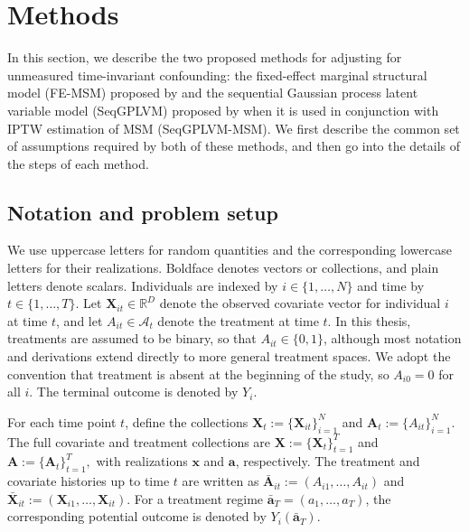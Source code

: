 \chapter{Methods}
\label{chap:method}
In this section, we describe the two proposed methods 
for adjusting for unmeasured time-invariant confounding: the fixed-effect marginal 
structural model (FE-MSM) proposed by 
and the sequential Gaussian process latent variable model (SeqGPLVM) 
proposed by  when it is used 
in conjunction with IPTW estimation of MSM (SeqGPLVM-MSM). We first describe the common set of
assumptions required by both of these methods, and then go 
into the details of the steps of each method.

\section{Notation and problem setup}
\label{sec:notation}

We use uppercase letters for random quantities and the corresponding lowercase
letters for their realizations. Boldface denotes vectors or collections, and plain
letters denote scalars. Individuals are indexed by \(i \in \{1,\dots,N\}\) and time
by \(t \in \{1,\dots,T\}\). Let \(\mathbf{X}_{it} \in \mathbb{R}^D\) denote the observed covariate vector for
individual \(i\) at time \(t\), and let \(A_{it} \in \mathcal{A}_t\) denote the
treatment at time \(t\). In this thesis, treatments are assumed to be binary, so
that \(A_{it} \in \{0,1\}\), although most notation and derivations extend directly
to more general treatment spaces. We adopt the convention that treatment is absent at the
beginning of the study, so \(A_{i0}=0\) for all \(i\). The terminal outcome is denoted by \(Y_i\). 

For each time point \(t\), define the collections
$
\mathbf{X}_t := \{\mathbf{X}_{it}\}_{i=1}^N
$ and
$
\mathbf{A}_t := \{A_{it}\}_{i=1}^N.
$
The full covariate and treatment collections are
$
\mathbf{X} := \{\mathbf{X}_t\}_{t=1}^T 
$ and 
$
\mathbf{A} := \{\mathbf{A}_t\}_{t=1}^T,
$
with realizations \(\mathbf{x}\) and \(\mathbf{a}\), respectively. 
The treatment and covariate histories up to time \(t\) are written as
$
\bar{\mathbf{A}}_{it} := (A_{i1},\dots,A_{it})
$ and 
$
\bar{\mathbf{X}}_{it} := (\mathbf{X}_{i1},\dots,\mathbf{X}_{it}).
$
For a treatment regime \(\bar{\mathbf{a}}_T = (a_1,\dots,a_T)\), the corresponding potential
outcome is denoted by \(Y_i(\bar{\mathbf{a}}_T)\).

